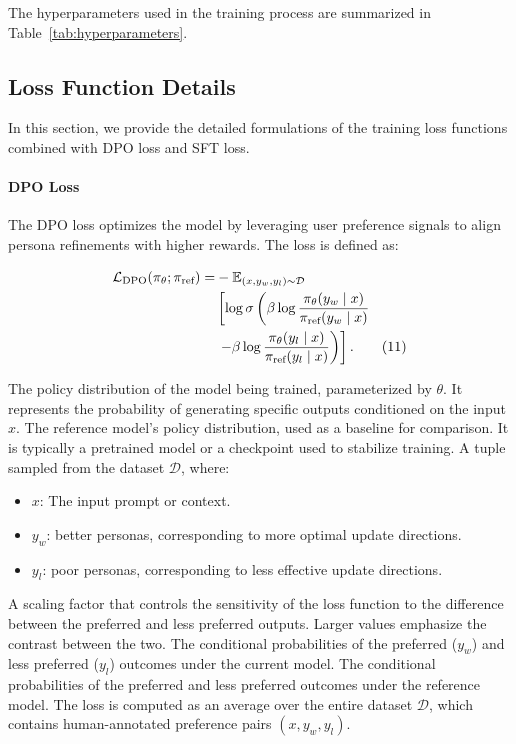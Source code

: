 The hyperparameters used in the training process are summarized in Table~\ref{tab:hyperparameters}.

\subsection{Loss Function Details}
In this section, we provide the detailed formulations of the training loss functions combined with DPO loss and SFT loss.

\paragraph{DPO Loss}
The DPO loss optimizes the model by leveraging user preference signals to align persona refinements with higher rewards. The loss is defined as:

\begin{align}
  \small
  \mathcal{L}_{\text{DPO}}(\pi_\theta; \pi_{\text{ref}}) = 
  &-\mathbb{E}_{(x, y_w, y_l) \sim \mathcal{D}} \notag \\
  &\left[ 
  \log \sigma \left( 
  \beta \log \frac{\pi_\theta(y_w \mid x)}{\pi_{\text{ref}}(y_w \mid x)} 
  \right. \right. \notag \\
  &\left. \left. - 
  \beta \log \frac{\pi_\theta(y_l \mid x)}{\pi_{\text{ref}}(y_l \mid x)} 
  \right) 
  \right]. \tag{11}
  \end{align} 
  
  
The policy distribution of the model being trained, parameterized by \(\theta\). It represents the probability of generating specific outputs conditioned on the input \(x\).
The reference model's policy distribution, used as a baseline for comparison. It is typically a pretrained model or a checkpoint used to stabilize training.
A tuple sampled from the dataset \(\mathcal{D}\), where:
\begin{itemize}[noitemsep,left=0pt]
        \item \(x\): The input prompt or context.
        \item \(y_w\): better personas, corresponding to more optimal update directions.
        \item \(y_l\): poor personas, corresponding to less effective update directions.
\end{itemize}

    A scaling factor that controls the sensitivity of the loss function to the difference between the preferred and less preferred outputs. Larger values emphasize the contrast between the two.
    The conditional probabilities of the preferred (\(y_w\)) and less preferred (\(y_l\)) outcomes under the current model.
    The conditional probabilities of the preferred and less preferred outcomes under the reference model.
    The loss is computed as an average over the entire dataset \(\mathcal{D}\), which contains human-annotated preference pairs \((x, y_w, y_l)\).



